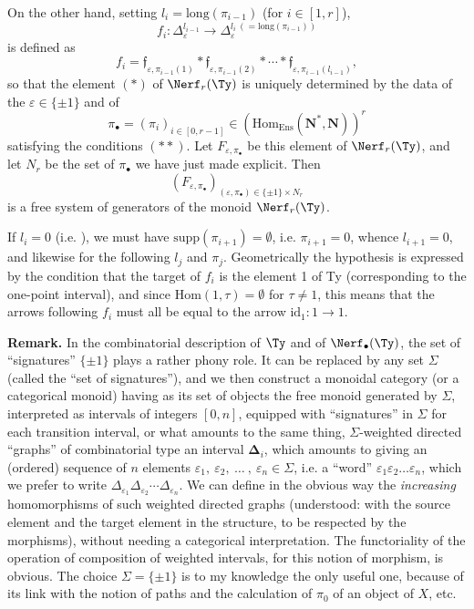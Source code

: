 On the other hand, setting $l_i = \mathrm{long}(\pi_{i-1})$ (for $i \in [1,r]$),
\[
f_i : \Delta_\varepsilon^{l_{i-1}} \longrightarrow \Delta_\varepsilon^{l_i\ (=\mathrm{long}(\pi_{i-1}))}
\]
is defined as
\[
f_i = \mathfrak{f}_{\varepsilon,\pi_{i-1}(1)} * \mathfrak{f}_{\varepsilon,\pi_{i-1}(2)} * \cdots * \mathfrak{f}_{\varepsilon,\pi_{i-1}(l_{i-1})},
\]
so that the element $(*)$ of $\Nerf_r(\Ty)$ is uniquely determined by the data of the $\varepsilon \in \{\pm 1\}$ and of
\[
\pi_\bullet = (\pi_i)_{i\in[0,r-1]} \in (\mathrm{Hom}_{\mathrm{Ens}}(\mathbf{N}^*,\mathbf{N}))^r
\]
satisfying the conditions $(**)$. Let $F_{\varepsilon,\pi_\bullet}$ be this element of $\Nerf_r(\Ty)$, and let $N_r$ be the set of $\pi_\bullet$ we have just made explicit. Then
\[
(F_{\varepsilon,\pi_\bullet})_{(\varepsilon,\pi_\bullet)\in\{\pm1\}\times N_r}
\]
is a free system of generators of the monoid $\Nerf_r(\Ty)$.

If $l_i = 0$ (i.e. ), we must have $\mathrm{supp}(\pi_{i+1}) = \emptyset$, i.e. $\pi_{i+1} = 0$, whence $l_{i+1} = 0$, and likewise for the following $l_j$ and $\pi_j$. Geometrically the hypothesis is expressed by the condition that the target
of $f_i$ is the element 1 of Ty (corresponding to the one-point interval), and since $\mathrm{Hom}(1,\tau) = \emptyset$ for $\tau \neq 1$, this means that the arrows following $f_i$ must all be equal to the arrow $\mathrm{id}_1 : 1 \longrightarrow 1$.

\textbf{Remark.} In the combinatorial description of $\Ty$ and of $\Nerf_\bullet(\Ty)$, the set of ``signatures'' $\{\pm1\}$ plays a rather phony role. It can be replaced by any set $\Sigma$ (called the ``set of signatures''), and we then construct a monoidal category (or a categorical monoid) having as its set of objects the free monoid generated by $\Sigma$, interpreted as intervals of integers $[0,n]$, equipped with ``signatures'' in $\Sigma$ for each transition interval, or what amounts to the same thing, $\Sigma$-weighted directed ``graphs'' of combinatorial type an interval $\boldsymbol{\Delta}_i$, which amounts to giving an (ordered) sequence of $n$ elements $\varepsilon_1,\ \varepsilon_2,\ \ldots\ ,\ \varepsilon_n \in \Sigma$, i.e. a ``word'' $\varepsilon_1\varepsilon_2\ldots\varepsilon_n$, which we prefer to write $\Delta_{\varepsilon_1}\Delta_{\varepsilon_2}\cdots\Delta_{\varepsilon_n}$. We can define in the obvious way the \textit{increasing} homomorphisms of such weighted directed graphs (understood: with the source element and the target element in the structure, to be respected by the morphisms), without needing a categorical interpretation. The functoriality of the operation of composition of weighted intervals, for this notion of morphism, is obvious. The
choice $\Sigma = \{\pm1\}$ is to my knowledge the only useful one, because of its link with the notion of paths and the calculation of $\pi_0$ of an object of $X$, etc.


